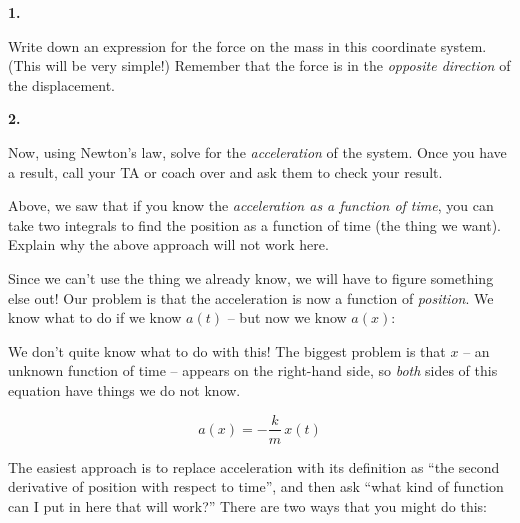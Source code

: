 \documentclass[12pt]{article}
\begin{document}
{\bf 1.}
\begin{minipage}{0.4\textwidth}
Write down an expression for the force on the mass in this coordinate system. (This will be very simple!) Remember that the force is in the {\it opposite direction} of the displacement.
\end{minipage}
\hspace{0.1\textwidth}
{\bf 2.}
\begin{minipage}{0.46\textwidth}
Now, using Newton's law, solve for the {\it acceleration} of the system. Once you have a result, call your TA or coach over and ask them to check your result. 
\end{minipage}

\vspace{1in}



Above, we saw that if you know the {\it acceleration as a function of time}, you can take two integrals to find the position as a function of time (the thing we want). Explain why the above approach will not work here. 

\vspace{1in}
\newpage
Since we can't use the thing we already know, we will have to figure something else out! Our problem is that the acceleration is now a function of {\it position}. We know what to do if we know $a(t)$ -- but now we know $a(x)$:

We don't quite know what to do with this! The biggest problem is that $x$ -- an unknown function of time -- appears on the right-hand side, so {\it both} sides of this equation have things we do not know.

$$a(x) = -\frac{k}{m}\,x(t)$$

The easiest approach is to replace acceleration with its definition as ``the second derivative of position with respect to time'', and then ask ``what kind of function can I put in here that will work?'' There are two ways that you might do this:

\vspace{0.3in}

\begin{center}\underline{\hspace{6in}}\end{center}
\end{document}

